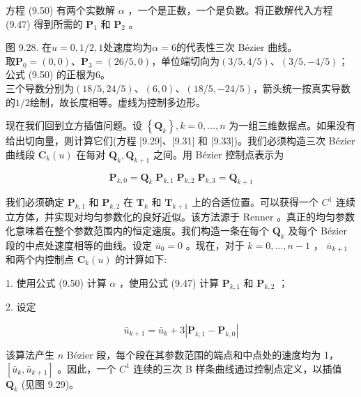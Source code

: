 \documentclass[../main.tex]{subfiles}
\begin{document}
方程 (9.50) 有两个实数解 \(\alpha\) ，一个是正数，一个是负数。将正数解代入方程 (9.47) 得到所需的 \({\mathbf{P}}_{1}\) 和 \({\mathbf{P}}_{2}\) 。

\begin{center}
\begin{minipage}{27cm}
\vspace*{.6\baselineskip}
\centering
{}
\par\smallskip
图 9.28. 在$u=0,1/2,1$处速度均为$\alpha=6$的代表性三次 Bézier 曲线。\\
取$\mathbf P_0=(0,0)$、$\mathbf P_3=(26/5,0)$，单位端切向为$(3/5,4/5)$、$(3/5,-4/5)$；公式 (9.50) 的正根为$6$。\\
三个导数分别为$(18/5,24/5)$、$(6,0)$、$(18/5,-24/5)$，箭头统一按真实导数的$1/2$绘制，故长度相等。虚线为控制多边形。
\end{minipage}
\end{center}

现在我们回到立方插值问题。设 \(\left\{  {\mathbf{Q}}_{k}\right\}  ,k = 0,\ldots ,n\) 为一组三维数据点。如果没有给出切向量，则计算它们(方程 [9.29]、[9.31] 和 [9.33])。我们必须构造三次 Bézier 曲线段 \({\mathbf{C}}_{k}\left( u\right)\) 在每对 \({\mathbf{Q}}_{k},{\mathbf{Q}}_{k + 1}\) 之间。用 Bézier 控制点表示为

\[
{\mathbf{P}}_{k,0} = {\mathbf{Q}}_{k}\;{\mathbf{P}}_{k,1}\;{\mathbf{P}}_{k,2}\;{\mathbf{P}}_{k,3} = {\mathbf{Q}}_{k + 1} \tag{9.51}
\]

我们必须确定 \({\mathbf{P}}_{k,1}\) 和 \({\mathbf{P}}_{k,2}\) 在 \({\mathbf{T}}_{k}\) 和 \({\mathbf{T}}_{k + 1}\) 上的合适位置。可以获得一个 \({C}^{1}\) 连续立方体，并实现对均匀参数化的良好近似。该方法源于 Renner \cite{Renn82}。真正的均匀参数化意味着在整个参数范围内的恒定速度。我们构造一条在每个 \({\mathbf{Q}}_{k}\) 及每个 Bézier 段的中点处速度相等的曲线。设定 \({\bar{u}}_{0} = 0\) 。现在，对于 \(k = 0,\ldots ,n - 1\) ， \({\bar{u}}_{k + 1}\) 和两个内控制点 \({\mathbf{C}}_{k}\left( u\right)\) 的计算如下:

1. 使用公式 (9.50) 计算 \(\alpha\) ，使用公式 (9.47) 计算 \({\mathbf{P}}_{k,1}\) 和 \({\mathbf{P}}_{k,2}\) ；

2. 设定

\[
{\bar{u}}_{k + 1} = {\bar{u}}_{k} + 3\left| {{\mathbf{P}}_{k,1} - {\mathbf{P}}_{k,0}}\right|  \tag{9.52}
\]

该算法产生 \(n\) Bézier 段，每个段在其参数范围的端点和中点处的速度均为 1， \(\left\lbrack  {{\bar{u}}_{k},{\bar{u}}_{k + 1}}\right\rbrack\) 。因此，一个 \({C}^{1}\) 连续的三次 B 样条曲线通过控制点定义，以插值 \({\mathbf{Q}}_{k}\) (见图 9.29)。
\end{document}
